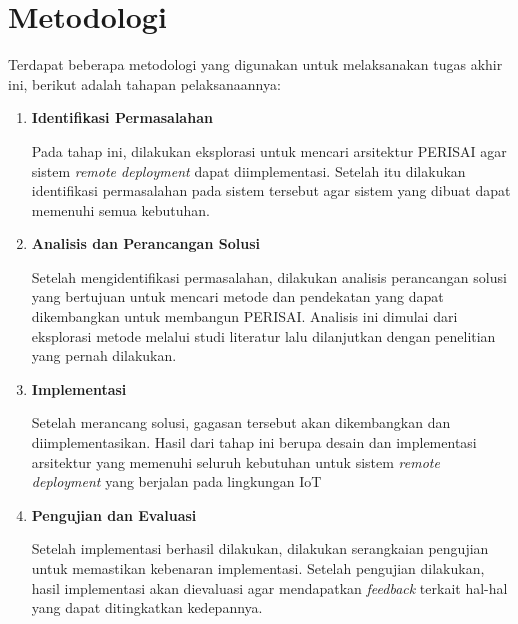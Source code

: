 \section{Metodologi}

Terdapat beberapa metodologi yang digunakan untuk melaksanakan tugas akhir ini, berikut adalah tahapan pelaksanaannya:
\begin{enumerate}
  \item \textbf{Identifikasi Permasalahan}

        Pada tahap ini, dilakukan eksplorasi untuk mencari arsitektur PERISAI agar sistem \textit{remote deployment} dapat diimplementasi. Setelah itu dilakukan identifikasi permasalahan pada sistem tersebut agar sistem yang dibuat dapat memenuhi semua kebutuhan.

  \item \textbf{Analisis dan Perancangan Solusi}

        Setelah mengidentifikasi permasalahan, dilakukan analisis perancangan solusi yang bertujuan untuk mencari metode dan pendekatan yang dapat dikembangkan untuk membangun PERISAI. Analisis ini dimulai dari eksplorasi metode melalui studi literatur lalu dilanjutkan dengan penelitian yang pernah dilakukan.

  \item \textbf{Implementasi}

        Setelah merancang solusi, gagasan tersebut akan dikembangkan dan diimplementasikan. Hasil dari tahap ini berupa desain dan implementasi arsitektur yang memenuhi seluruh kebutuhan untuk sistem \textit{remote deployment} yang berjalan pada lingkungan IoT

  \item \textbf{Pengujian dan Evaluasi}

        Setelah implementasi berhasil dilakukan, dilakukan serangkaian pengujian untuk memastikan kebenaran implementasi. Setelah pengujian dilakukan, hasil implementasi akan dievaluasi agar mendapatkan \textit{feedback} terkait hal-hal yang dapat ditingkatkan kedepannya.

\end{enumerate}